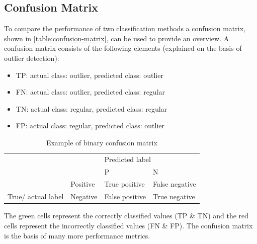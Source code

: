 \subsection{Confusion Matrix}
To compare the performance of two classification methods a confusion matrix, shown in \autoref{table:confusion-matrix}, can be used to provide an overview. A confusion matrix consists of the following elements (explained on the basis of outlier detection):
\begin{itemize}
    \item \ac{TP}: actual class: outlier, predicted class: outlier
    \item \ac{FN}: actual class: outlier, predicted class: regular
    \item \ac{TN}: actual class: regular, predicted class: regular
    \item \ac{FP}: actual class: regular, predicted class: outlier
\end{itemize}
\begin{table}[ht]
    \begin{tabular}{llll}
     &  & \multicolumn{2}{l}{Predicted label} \\ \cline{3-4} 
     & \multicolumn{1}{l|}{} & \multicolumn{1}{l|}{\ac{P}} & \multicolumn{1}{l|}{\ac{N}} \\ \cline{2-4} 
    \multicolumn{1}{l|}{} & \multicolumn{1}{l|}{Positive} & \multicolumn{1}{l|}{\cellcolor[HTML]{9AFF99}True positive} & \multicolumn{1}{l|}{\cellcolor[HTML]{FFCCC9}False negative} \\ \cline{2-4} 
    \multicolumn{1}{l|}{\multirow{-2}{*}{True/ actual label}} & \multicolumn{1}{l|}{Negative} & \multicolumn{1}{l|}{\cellcolor[HTML]{FFCCC9}False positive} & \multicolumn{1}{l|}{\cellcolor[HTML]{9AFF99}True negative} \\ \cline{2-4} 
\end{tabular}
\caption{Example of binary confusion matrix}
\label{table:confusion-matrix}
\end{table}
The green cells represent the correctly classified values (\ac{TP} \& \ac{TN}) and the red cells represent the incorrectly classified values (\ac{FN} \& \ac{FP}). The confusion matrix is the basis of many more performance metrics.
